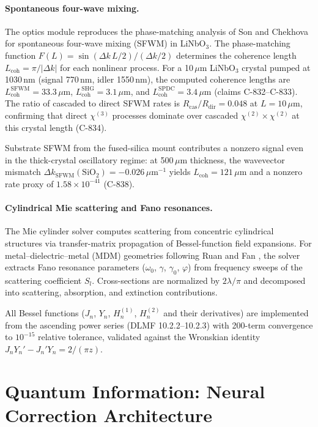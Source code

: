 \documentclass[12pt,openany]{report}
\theoremstyle{definition}
\theoremstyle{plain}
\theoremstyle{remark}
\begin{document}
\paragraph{Spontaneous four-wave mixing.}
The optics module reproduces the phase-matching analysis of
Son and Chekhova \cite{SonChekhova2026} for spontaneous four-wave
mixing (SFWM) in LiNbO$_3$.  The phase-matching function
$F(L) = \sin(\Delta k\, L/2) / (\Delta k/2)$ determines the
coherence length $L_{\mathrm{coh}} = \pi/|\Delta k|$ for each
nonlinear process.  For a 10\,$\mu$m LiNbO$_3$ crystal pumped at
1030\,nm (signal 770\,nm, idler 1550\,nm), the computed coherence
lengths are $L_{\mathrm{coh}}^{\mathrm{SFWM}} = 33.3\,\mu$m,
$L_{\mathrm{coh}}^{\mathrm{SHG}} = 3.1\,\mu$m, and
$L_{\mathrm{coh}}^{\mathrm{SPDC}} = 3.4\,\mu$m (claims C-832--C-833).
The ratio of cascaded to direct SFWM rates is
$R_{\mathrm{cas}}/R_{\mathrm{dir}} = 0.048$ at $L = 10\,\mu$m,
confirming that direct $\chi^{(3)}$ processes dominate over cascaded
$\chi^{(2)} \times \chi^{(2)}$ at this crystal length (C-834).

Substrate SFWM from the fused-silica mount contributes a nonzero
signal even in the thick-crystal oscillatory regime: at 500\,$\mu$m
thickness, the wavevector mismatch $\Delta k_{\mathrm{SFWM}}(\mathrm{SiO}_2)
= -0.026\,\mu\mathrm{m}^{-1}$ yields $L_{\mathrm{coh}} = 121\,\mu$m
and a nonzero rate proxy of $1.58 \times 10^{-41}$ (C-838).

\paragraph{Cylindrical Mie scattering and Fano resonances.}
The Mie cylinder solver computes scattering from concentric cylindrical
structures via transfer-matrix propagation of Bessel-function field
expansions.  For metal--dielectric--metal (MDM) geometries following
Ruan and Fan \cite{RuanFan2010}, the solver extracts Fano resonance
parameters ($\omega_0$, $\gamma$, $\gamma_0$, $\varphi$) from
frequency sweeps of the scattering coefficient $S_l$.  Cross-sections
are normalized by $2\lambda/\pi$ and decomposed into scattering,
absorption, and extinction contributions.

All Bessel functions ($J_n$, $Y_n$, $H_n^{(1)}$, $H_n^{(2)}$ and
their derivatives) are implemented from the ascending power series
(DLMF 10.2.2--10.2.3) with 200-term convergence to $10^{-15}$
relative tolerance, validated against the Wronskian identity
$J_n Y_n' - J_n' Y_n = 2/(\pi z)$.


\section{Quantum Information: Neural Correction Architecture}
\end{document}
